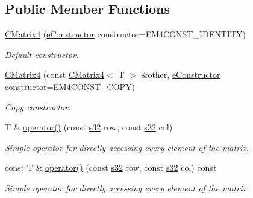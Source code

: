 \subsection*{Public Member Functions}
\begin{DoxyCompactItemize}
\item 
\hyperlink{classirr_1_1core_1_1CMatrix4_af771bfde63cdaa3baa4d9f6121e56411}{C\+Matrix4} (\hyperlink{classirr_1_1core_1_1CMatrix4_a7bb79712227617f706ed57a34f3eb4fe}{e\+Constructor} constructor=E\+M4\+C\+O\+N\+S\+T\+\_\+\+I\+D\+E\+N\+T\+I\+TY)
\begin{DoxyCompactList}\small\item\em Default constructor. \end{DoxyCompactList}\item 
\hyperlink{classirr_1_1core_1_1CMatrix4_acdb7afc2248d97a7e882cd1bdeed07b7}{C\+Matrix4} (const \hyperlink{classirr_1_1core_1_1CMatrix4}{C\+Matrix4}$<$ T $>$ \&other, \hyperlink{classirr_1_1core_1_1CMatrix4_a7bb79712227617f706ed57a34f3eb4fe}{e\+Constructor} constructor=E\+M4\+C\+O\+N\+S\+T\+\_\+\+C\+O\+PY)
\begin{DoxyCompactList}\small\item\em Copy constructor. \end{DoxyCompactList}\item 
\mbox{\label{classirr_1_1core_1_1CMatrix4_aaede6824ed3ee05b928815d52e1834d1}} 
T \& \hyperlink{classirr_1_1core_1_1CMatrix4_aaede6824ed3ee05b928815d52e1834d1}{operator()} (const \hyperlink{namespaceirr_ac66849b7a6ed16e30ebede579f9b47c6}{s32} row, const \hyperlink{namespaceirr_ac66849b7a6ed16e30ebede579f9b47c6}{s32} col)
\begin{DoxyCompactList}\small\item\em Simple operator for directly accessing every element of the matrix. \end{DoxyCompactList}\item 
\mbox{\label{classirr_1_1core_1_1CMatrix4_ae46b8b6b47897f4bc8eee2d1c226cab8}} 
const T \& \hyperlink{classirr_1_1core_1_1CMatrix4_ae46b8b6b47897f4bc8eee2d1c226cab8}{operator()} (const \hyperlink{namespaceirr_ac66849b7a6ed16e30ebede579f9b47c6}{s32} row, const \hyperlink{namespaceirr_ac66849b7a6ed16e30ebede579f9b47c6}{s32} col) const
\begin{DoxyCompactList}\small\item\em Simple operator for directly accessing every element of the matrix. \end{DoxyCompactList}\item 

\end{DoxyCompactItemize}
